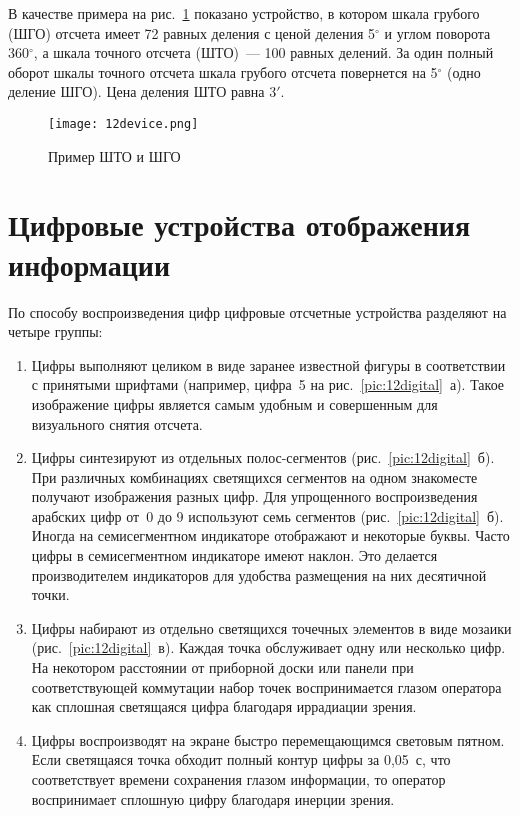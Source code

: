 В качестве примера на рис.~\ref{pic:12device} показано устройство, в котором шкала грубого (ШГО) отсчета имеет 72 равных деления с ценой деления 5$ ^\circ $ и углом поворота 360$ ^\circ $, а шкала точного отсчета (ШТО)~--- 100 равных делений. За один полный оборот шкалы точного отсчета шкала грубого отсчета повернется на 5$ ^\circ $ (одно деление ШГО). Цена деления ШТО равна 3$ ' $.

\begin{figure}[h!]
	\caption{ Пример ШТО и ШГО }
	\texttt{[image: 12device.png]}
	\label{pic:12device}
\end{figure}

\section{ Цифровые устройства отображения информации }
По способу воспроизведения цифр цифровые отсчетные устройства разделяют на четыре группы:
\begin{enumerate}
\item Цифры выполняют целиком в виде заранее известной фигуры в соответствии с принятыми шрифтами (например, цифра~5 на рис.~\ref{pic:12digital}~а). Такое изображение цифры является самым удобным и совершенным для визуального снятия отсчета.
\item Цифры синтезируют из отдельных полос-сегментов (рис.~\ref{pic:12digital}~б). При различных комбинациях светящихся сегментов на одном знакоместе получают изображения разных цифр. Для упрощенного воспроизведения арабских цифр от~0 до 9 используют семь сегментов (рис.~\ref{pic:12digital}~б). Иногда на семисегментном индикаторе отображают и некоторые буквы. Часто цифры в семисегментном индикаторе имеют наклон. Это делается производителем индикаторов для удобства размещения на них десятичной точки.
\item Цифры набирают из отдельно светящихся точечных элементов в виде мозаики (рис.~\ref{pic:12digital}~в). Каждая точка обслуживает одну или несколько цифр. На некотором расстоянии от приборной доски или панели при соответствующей коммутации набор точек воспринимается глазом оператора как сплошная светящаяся цифра благодаря иррадиации зрения.
\item Цифры воспроизводят на экране быстро перемещающимся световым пятном. Если светящаяся точка обходит полный контур цифры за 0,05~с, что соответствует времени сохранения глазом информации, то оператор воспринимает сплошную цифру благодаря инерции зрения.
\end{enumerate}

